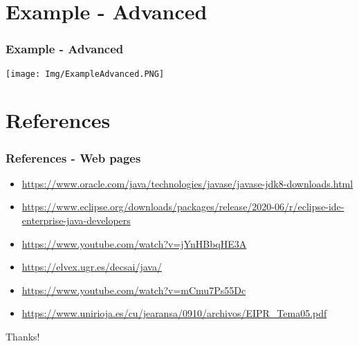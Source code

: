 \documentclass[11pt]{beamer}
\begin{document}
\section{Example - Advanced}
\begin{frame}
\frametitle{Example - Advanced}
\begin{center}
{\texttt{[image: Img/ExampleAdvanced.PNG]}   }
\end{center}
\end{frame}




\section{References}
\begin{frame}
\frametitle{References - Web pages}
\begin{itemize}

\item \url{https://www.oracle.com/java/technologies/javase/javase-jdk8-downloads.html}
\item \url{https://www.eclipse.org/downloads/packages/release/2020-06/r/eclipse-ide-enterprise-java-developers}
\item \url{https://www.youtube.com/watch?v=jYnHBbqHE3A}
\item \url{https://elvex.ugr.es/decsai/java/}
\item \url{https://www.youtube.com/watch?v=mCmu7Ps55Dc}
\item \url{https://www.unirioja.es/cu/jearansa/0910/archivos/EIPR_Tema05.pdf}
\end{itemize}
\end{frame}


\begin{frame}
\begin{center}
Thanks!

\end{center}
\end{frame}
\end{document}

